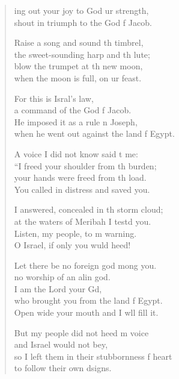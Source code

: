 \begin{verse}
  \begin{patverse}
ing out your joy to God ur strength,\Med\\
shout in triumph to the God f Jacob.

Raise a song and sound th timbrel,\Med\\
the sweet-sounding harp and th lute;\\
blow the trumpet at th new moon,\Med\\
when the moon is full, on ur feast.

For this is Isral’s law,\Med\\
a command of the God f Jacob.\\
He imposed it as a rule n Joseph,\Med\\
when he went out against the land f Egypt.

A voice I did not know said t me:\Med\\
“I freed your shoulder from th burden;\\
your hands were freed from th load.\Med\\
You called in distress and  saved you.

I answered, concealed in th storm cloud;\Med\\
at the waters of Meribah I testd you.\\
Listen, my people, to m warning.\Med\\
O Israel, if only you wuld heed!

Let there be no foreign god mong you.\Med\\
no worship of an alin god.\\
I am the Lord your Gd,\Flex\\
who brought you from the land f Egypt.\Med\\
Open wide your mouth and I w\pointup{\i}ll fill it.

But my people did not heed m voice\Med\\
and Israel would not bey,\\
so I left them in their stubbornness f heart\Med\\
to follow their own dsigns.


\end{patverse}
\end{verse}
